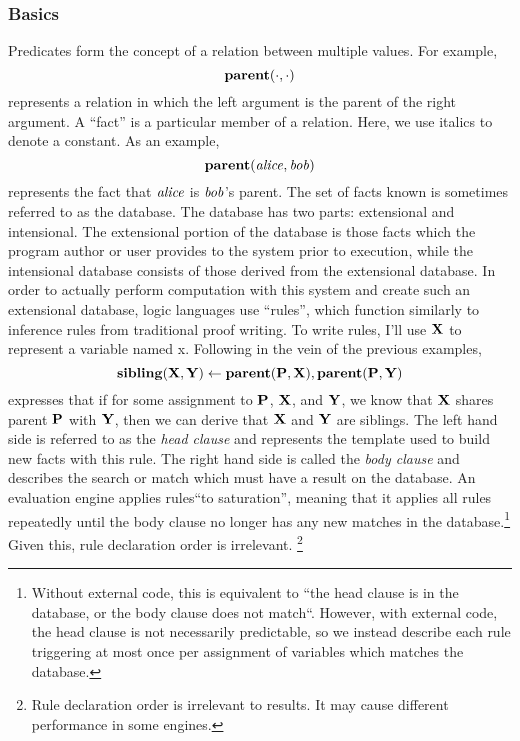 \subsubsection{Basics}
Predicates form the concept of a relation between multiple values.
For example,
\[
        {\bf parent}(\cdot, \cdot)
\]
represents a relation in which the left argument is the parent of the right argument.
A ``fact'' is a particular member of a relation.
Here, we use italics to denote a constant.
As an example,
\[
        {\bf parent}({\it alice}, {\it bob})
\]
represents the fact that ${\it alice}$ is ${\it bob}$'s parent.
The set of facts known is sometimes referred to as the database.
The database has two parts: extensional and intensional.
The extensional portion of the database is those facts which the program author or user provides to the system prior to execution, while the intensional database consists of those derived from the extensional database.
In order to actually perform computation with this system and create such an extensional database, logic languages use ``rules'', which function similarly to inference rules from traditional proof writing.
To write rules, I'll use ${\bf X}$ to represent a variable named x.
Following in the vein of the previous examples,
\[
        {\bf sibling}({\bf X}, {\bf Y}) \leftarrow {\bf parent}({\bf P}, {\bf X}), {\bf parent}({\bf P}, {\bf Y})
\]
expresses that if for some assignment to ${\bf P}$, ${\bf X}$, and ${\bf Y}$, we know that ${\bf X}$ shares parent ${\bf P}$ with ${\bf Y}$, then we can derive that ${\bf X}$ and ${\bf Y}$ are siblings.
The left hand side is referred to as the \emph{head clause} and represents the template used to build new facts with this rule.
The right hand side is called the \emph{body clause} and describes the search or match which must have a result on the database.
An evaluation engine applies rules``to saturation'', meaning that it applies all rules repeatedly until the body clause no longer has any new matches in the database.\footnote {
Without external code, this is equivalent to ``the head clause is in the database, or the body clause does not match``. However, with external code, the head clause is not necessarily predictable, so we instead describe each rule triggering at most once per assignment of variables which matches the database.
}
Given this, rule declaration order is irrelevant.
\footnote{
  Rule declaration order is irrelevant to results.
  It may cause different performance in some engines.
}
